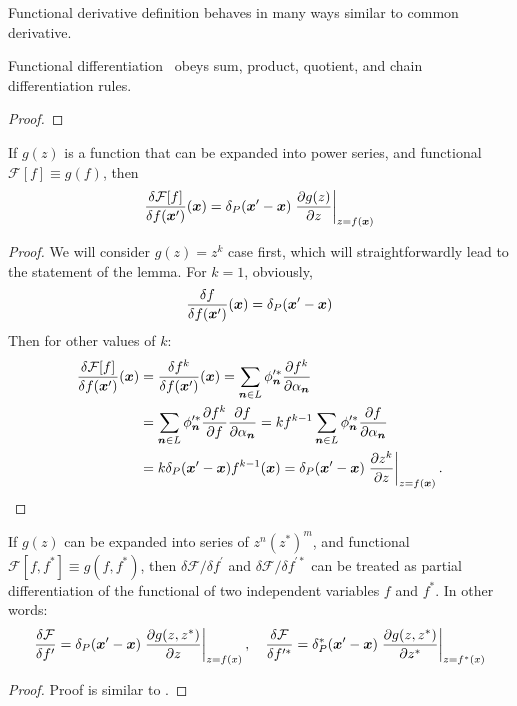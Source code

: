 Functional derivative definition behaves in many ways similar to common derivative.
\begin{lemma}
Functional differentiation~ obeys sum, product, quotient, and chain differentiation rules.
\end{lemma}
\begin{proof}
\end{proof}

\begin{lemma}
If $g(z)$ is a function that can be expanded into power series,
and functional $\mathcal{F}[f] \equiv g(f)$, then
\[
	\frac{\delta \mathcal{F}[f]}{\delta f(\boldsymbol{x}^\prime)} (\boldsymbol{x})
	= \delta_P(\boldsymbol{x}^\prime - \boldsymbol{x})
		\left. \frac{\partial g(z)}{\partial z} \right|_{z = f(\boldsymbol{x})}
\]
\end{lemma}
\begin{proof}
We will consider $g(z) = z^k$ case first, which will straightforwardly lead to the statement of the lemma.
For $k = 1$, obviously,
\[
	\frac{\delta f}{\delta f(\boldsymbol{x}^\prime)} (\boldsymbol{x})
	= \delta_P(\boldsymbol{x}^\prime - \boldsymbol{x})
\]
Then for other values of $k$:
\begin{equation*}
\begin{split}
	\frac{\delta \mathcal{F}[f]}{\delta f(\boldsymbol{x}^\prime)} (\boldsymbol{x})
	& = \frac{\delta f^k}{\delta f(\boldsymbol{x}^\prime)} (\boldsymbol{x})
	= \sum\limits_{\boldsymbol{n} \in L} \phi_{\boldsymbol{n}}^{\prime*}
		\frac{\partial f^k}{\partial \alpha_{\boldsymbol{n}}} \\
	& = \sum\limits_{\boldsymbol{n} \in L} \phi_{\boldsymbol{n}}^{\prime*}
		\frac{\partial f^k}{\partial f}
		\frac{\partial f}{\partial \alpha_{\boldsymbol{n}}}
	= k f^{k-1}
		\sum\limits_{\boldsymbol{n} \in L} \phi_{\boldsymbol{n}}^{\prime*}
		\frac{\partial f}{\partial \alpha_{\boldsymbol{n}}} \\
	& = k \delta_P(\boldsymbol{x}^\prime - \boldsymbol{x}) f^{k-1}(\boldsymbol{x})
	= \delta_P(\boldsymbol{x}^\prime - \boldsymbol{x})
		\left. \frac{\partial z^k}{\partial z} \right|_{z = f(\boldsymbol{x})}.
	\qedhere
\end{split}
\end{equation*}
\end{proof}

\begin{lemma}
If $g(z)$ can be expanded into series of $z^n (z^*)^m$,
and functional $\mathcal{F}[f, f^*] \equiv g(f, f^*)$,
then $\delta \mathcal{F} / \delta f^\prime$ and $\delta \mathcal{F} / \delta f^{\prime*}$ can be treated as partial differentiation of the functional of two independent variables $f$ and $f^*$.
In other words:
\[
	\frac{\delta \mathcal{F}}{\delta f^\prime}
	= \delta_P(\boldsymbol{x}^\prime - \boldsymbol{x}) \left.
		\frac{\partial g(z, z^*)}{\partial z}
	\right|_{z=f(x)},
	\quad
	\frac{\delta \mathcal{F}}{\delta f^{\prime*}}
	= \delta_P^*(\boldsymbol{x}^\prime - \boldsymbol{x}) \left.
		\frac{\partial g(z, z^*)}{\partial z^*}
	\right|_{z=f^*(x)}
\]
\end{lemma}
\begin{proof}
Proof is similar to .
\end{proof}

